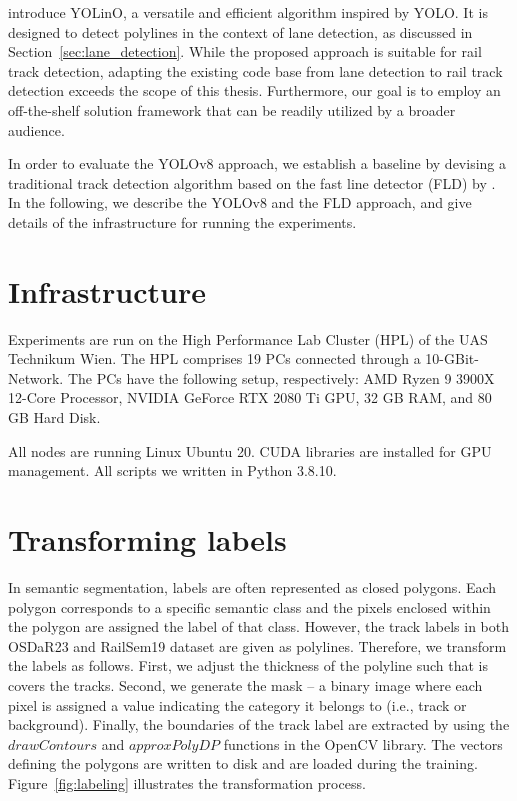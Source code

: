 \documentclass[Master,MDS,english]{BASE/twbook} %
\begin{document}
\cite{meyer2021yolino} introduce YOLinO, a versatile and efficient algorithm inspired by YOLO. It is designed to detect polylines in the context of lane detection, as discussed in Section~\ref{sec:lane_detection}. While the proposed approach is suitable for rail track detection, adapting the existing code base from lane detection to rail track detection exceeds the scope of this thesis. Furthermore, our goal is to employ an off-the-shelf solution framework that can be readily utilized by a broader audience.

In order to evaluate the YOLOv8 approach, we establish a baseline by devising a traditional track detection algorithm based on the fast line detector (FLD) by \cite{FLD}.
In the following, we describe the YOLOv8 and the FLD approach, and give details of the infrastructure for running the experiments.

\section{Infrastructure}

Experiments are run on the High Performance Lab Cluster (HPL) of the UAS Technikum Wien. 
The HPL comprises 19 PCs connected through a 10-GBit-Network. The PCs have the following setup, respectively: AMD Ryzen 9 3900X 12-Core Processor, NVIDIA GeForce RTX 2080 Ti GPU, 32 GB RAM, and 80 GB Hard Disk.

All nodes are running Linux Ubuntu 20. CUDA libraries are installed for GPU management. All scripts we written in Python 3.8.10. 


\section{Transforming labels} 

In semantic segmentation, labels are often represented as closed polygons. Each polygon corresponds to a specific semantic class and the pixels enclosed within the polygon are assigned the label of that class.
However, the track labels in both OSDaR23 and RailSem19 dataset are given as polylines. Therefore, we transform the labels as follows. First, we adjust the thickness of the polyline such that is covers the tracks. Second, we generate the mask -- a binary image where each pixel is assigned a value indicating the category it belongs to (i.e., track or background). Finally, the boundaries of the track label are extracted by using the $drawContours$ and $approxPolyDP$ functions in the OpenCV library. The vectors defining the polygons are written to disk and are loaded during the training.  Figure~\ref{fig:labeling} illustrates the transformation process.
\end{document}
